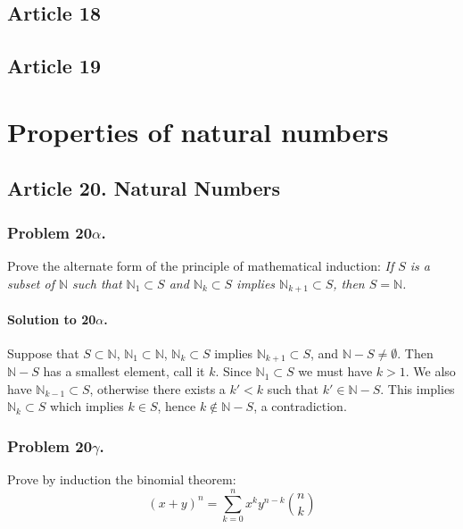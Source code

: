 \subsection{Article 18}

\subsection{Article 19}


\section{Properties of natural numbers}


\subsection{Article 20. Natural Numbers}
\subsubsection{Problem 20$\alpha$.}
Prove the alternate form of the principle of mathematical induction: \textit{If
$S$ is a subset of $\mathbb{N}$ such that $\mathbb{N}_1 \subset S$ and
$\mathbb{N}_k \subset S$ implies $\mathbb{N}_{k+1} \subset S$, then $S = \mathbb{N}$.}

\paragraph*{Solution to 20$\alpha$.}
Suppose that $ S \subset \mathbb{N}$, $ \mathbb{N}_1 \subset \mathbb{N} $,
$\mathbb{N}_k \subset S $ implies $\mathbb{N}_{k+1} \subset S $, and $ \mathbb{N} - S
\neq \emptyset $. Then $ \mathbb{N} - S $ has a smallest element, call it $k$.
Since $\mathbb{N}_1 \subset S$  we must have $k > 1$.
We also have $ \mathbb{N}_{k-1} \subset S $, otherwise there exists a $k' < k$ such
that $k' \in \mathbb{N} - S$. This implies $ \mathbb{N}_k \subset S$ which
implies $ k \in S $, hence $ k \notin \mathbb{N} - S$, a contradiction.

\subsubsection{Problem 20$\gamma$.}
Prove by induction the binomial theorem:
$$ (x+y)^n = \sum_{k=0}^n x^k y^{n-k} {{n}\choose{k}} $$

